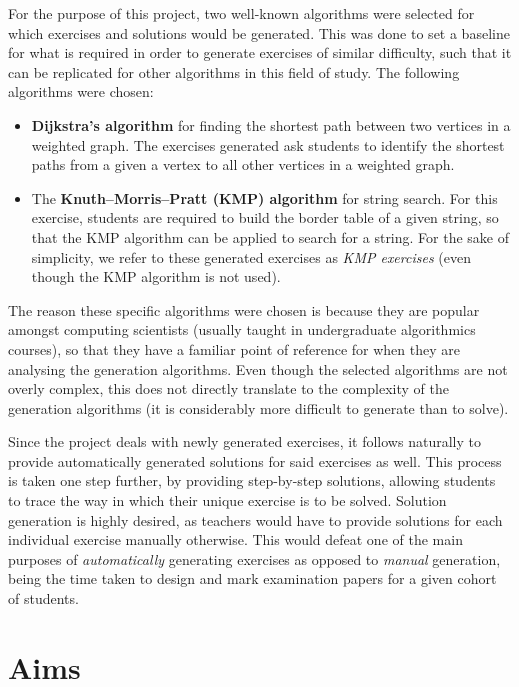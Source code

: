 \documentclass{l4proj}
\begin{document}
For the purpose of this project, two well-known algorithms were selected for which exercises and solutions would be generated. This was done to set a baseline for what is required in order to generate exercises of similar difficulty, such that it can be replicated for other algorithms in this field of study. The following algorithms were chosen:
\begin{itemize}
	\item
	\textbf{Dijkstra's algorithm} for finding the shortest path between two vertices in a weighted graph. The exercises generated ask students to identify the shortest paths from a given a vertex to all other vertices in a weighted graph.
	\item
	The \textbf{Knuth–Morris–Pratt (KMP) algorithm} for string search. For this exercise, students are required to build the border table of a given string, so that the KMP algorithm can be applied to search for a string. For the sake of simplicity, we refer to these generated exercises as \emph{KMP exercises} (even though the KMP algorithm is not used).
\end{itemize}
The reason these specific algorithms were chosen is because they are popular amongst computing scientists (usually taught in undergraduate algorithmics courses), so that they have a familiar point of reference for when they are analysing the generation algorithms. Even though the selected algorithms are not overly complex, this does not directly translate to the complexity of the generation algorithms (it is considerably more difficult to generate than to solve). 

Since the project deals with newly generated exercises, it follows naturally to provide automatically generated solutions for said exercises as well. This process is taken one step further, by providing step-by-step solutions, allowing students to trace the way in which their unique exercise is to be solved. Solution generation is highly desired, as teachers would have to provide solutions for each individual exercise manually otherwise. This would defeat one of the main purposes of \emph{automatically} generating exercises as opposed to \emph{manual} generation, being the time taken to design and mark examination papers for a given cohort of students.

\section{Aims}
\label{sec:aim}
\end{document}
